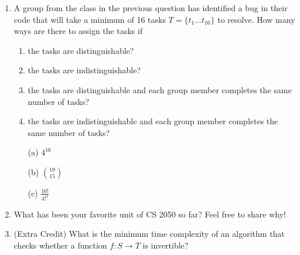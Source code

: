 \begin{enumerate}
\item A group from the class in the previous question has identified a bug in their code that will take a minimum of 16 tasks $T = \{t_1...t_{16}\}$ to resolve. How many ways are there to assign the tasks if 
\begin{enumerate}
    \item the tasks are distinguishable?
    \item the tasks are indistinguishable?
    \item the tasks are distinguishable and each group member completes the same number of tasks?
    \item the tasks are indistinguishable and each group member completes the same number of tasks?
\end{enumerate}

\begin{solution}
\begin{enumerate}
    \item[(a)] $4^16$
    \item[(b)] ${19 \choose 15}$
    \item[(c)] $\frac{16!}{4!^4}$
\end{enumerate}
\end{solution}
\item What has been your favorite unit of CS 2050 so far? Feel free to share why! 

\item (Extra Credit) What is the minimum time complexity of an algorithm that checks whether a function $f:S \rightarrow T$ is invertible? 

\end{enumerate}